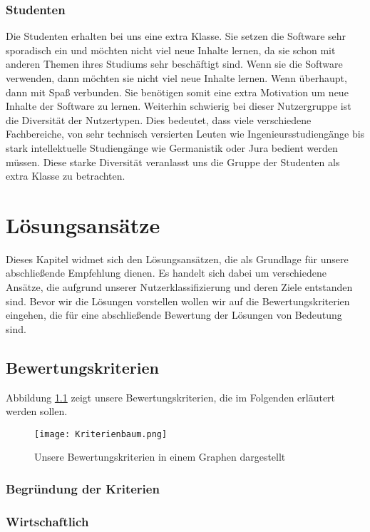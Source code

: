 \subsection{Studenten}
Die Studenten erhalten bei uns eine extra Klasse. Sie setzen die Software sehr sporadisch ein und möchten nicht viel neue Inhalte lernen, da sie schon mit anderen Themen ihres Studiums sehr beschäftigt sind. Wenn sie die Software verwenden, dann möchten sie nicht viel neue Inhalte lernen. Wenn überhaupt, dann mit Spaß verbunden. Sie benötigen somit eine extra Motivation um neue Inhalte der Software zu lernen. Weiterhin schwierig bei dieser Nutzergruppe ist die Diversität der Nutzertypen. Dies bedeutet, dass viele verschiedene Fachbereiche, von sehr technisch versierten Leuten wie Ingenieursstudiengänge bis stark intellektuelle Studiengänge wie Germanistik oder Jura bedient werden müssen. Diese starke Diversität veranlasst uns die Gruppe der Studenten als extra Klasse zu betrachten. 



\chapter{Lösungsansätze}
Dieses Kapitel widmet sich den Lösungsansätzen, die als Grundlage für unsere abschließende Empfehlung dienen. Es handelt sich dabei um verschiedene Ansätze, die aufgrund unserer Nutzerklassifizierung und deren Ziele entstanden sind. Bevor wir die Lösungen vorstellen wollen wir auf die Bewertungskriterien eingehen, die für eine abschließende Bewertung der Lösungen von Bedeutung sind.
\section{Bewertungskriterien}
Abbildung \ref{img1:criteria} zeigt unsere Bewertungskriterien, die im Folgenden erläutert werden sollen.
\begin{figure}[ht]
\begin{center}
\texttt{[image: Kriterienbaum.png]}
\caption{Unsere Bewertungskriterien in einem Graphen dargestellt}
\label{img1:criteria}
\end{center}
\end{figure} 

\subsection{Begründung der Kriterien}
\subsection{Wirtschaftlich}
